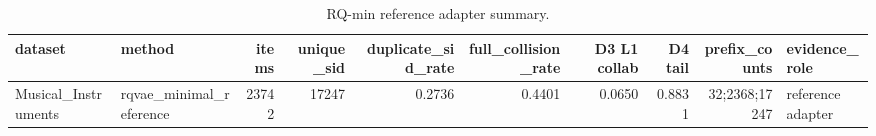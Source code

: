 \begin{table}
\caption{RQ-min reference adapter summary.}
\label{tab:rqvae-minimal-reference}
\begin{tabular}{llrrrrrrrl}
\toprule
dataset & method & items & unique\_sid & duplicate\_sid\_rate & full\_collision\_rate & D3 L1 collab & D4 tail & prefix\_counts & evidence\_role \\
\midrule
Musical\_Instruments & rqvae\_minimal\_reference & 23742 & 17247 & 0.2736 & 0.4401 & 0.0650 & 0.8831 & 32;2368;17247 & reference adapter \\
\bottomrule
\end{tabular}
\end{table}
